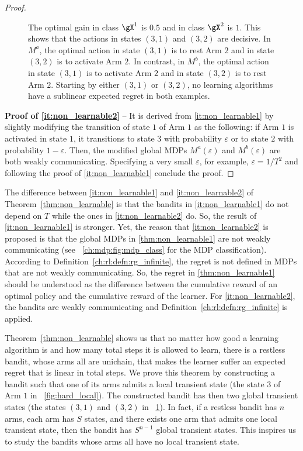 \begin{proof}
\begin{figure}[hp]
{            The optimal gain in class $\gX^1$ is $0.5$ and in class $\gX^2$ is $1$.
            This shows that the actions in states $(3,1)$ and $(3,2)$ are decisive.
            In $M^a$, the optimal action in state $(3,1)$ is to rest Arm $2$ and in state $(3,2)$ is to activate Arm $2$.
            In contrast, in $M^b$, the optimal action in state $(3,1)$ is to activate Arm $2$ and in state $(3,2)$ is to rest Arm $2$.
            Starting by either $(3,1)$ or $(3,2)$, no learning algorithms have a sublinear expected regret in both examples.
        }
        \label{fig:hard_global}
    \end{figure}

    \textbf{Proof of \ref{it:non_learnable2}} -- It is derived from \ref{it:non_learnable1} by slightly modifying the transition of state $1$ of Arm $1$ as the following: if Arm $1$ is activated in state $1$, it transitions to state $3$ with probability $\varepsilon$ or to state $2$ with probability $1-\varepsilon$.
    Then, the modified global MDPs $M^a(\varepsilon)$ and $M^b(\varepsilon)$ are both weakly communicating.
    Specifying a very small $\varepsilon$, for example, $\varepsilon=1/T^2$ and following the proof of \ref{it:non_learnable1} conclude the proof. 

\end{proof}

The difference between \ref{it:non_learnable1} and \ref{it:non_learnable2} of Theorem~\ref{thm:non_learnable} is that the bandits in \ref{it:non_learnable1} do not depend on $T$ while the ones in \ref{it:non_learnable2} do.
So, the result of \ref{it:non_learnable1} is stronger.
Yet, the reason that \ref{it:non_learnable2} is proposed is that the global MDPs in \ref{thm:non_learnable1} are not weakly communicating (see \figurename~\ref{ch:mdp:fig:mdp_class} for the MDP classification).
According to Definition~\ref{ch:rl:defn:rg_infinite}, the regret is not defined in MDPs that are not weakly communicating.
So, the regret in \ref{thm:non_learnable1} should be understood as the difference between the cumulative reward of an optimal policy and the cumulative reward of the learner. 
For \ref{it:non_learnable2}, the bandits are weakly communicating and Definition~\ref{ch:rl:defn:rg_infinite} is applied.

Theorem~\ref{thm:non_learnable} shows us that no matter how good a learning algorithm is and how many total steps it is allowed to learn, there is a restless bandit, whose arms all are unichain, that makes the learner suffer an expected regret that is linear in total steps.
We prove this theorem by constructing a bandit such that one of its arms admits a local transient state (the state $3$ of Arm $1$ in \figurename~\ref{fig:hard_local}).
The constructed bandit has then two global transient states (the states $(3,1)$ and $(3,2)$ in \figurename~\ref{fig:hard_global}).
In fact, if a restless bandit has $n$ arms, each arm has $S$ states, and there exists one arm that admits one local transient state, then the bandit has $S^{n-1}$ global transient states.
This inspires us to study the bandits whose arms all have no local transient state.

